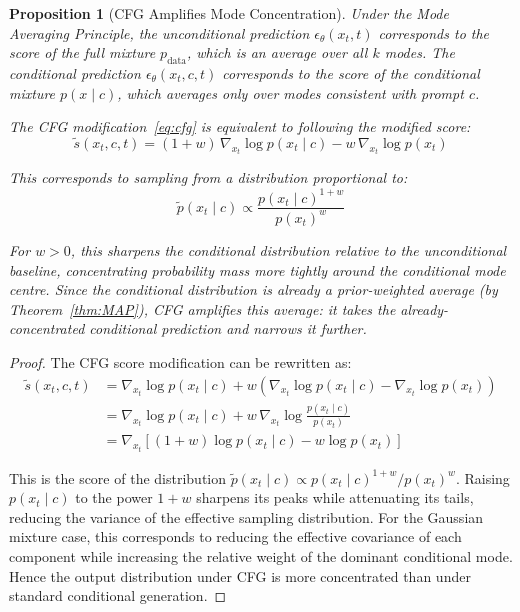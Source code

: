 \documentclass[11pt]{article}
\newtheorem{proposition}[theorem]{Proposition}
\begin{document}
\begin{proposition}[CFG Amplifies Mode Concentration]\label{prop:cfg}
Under the Mode Averaging Principle, the unconditional prediction $\epsilon_\theta(x_t, t)$ corresponds to the score of the full mixture $p_{\mathrm{data}}$, which is an average over all $k$ modes. The conditional prediction $\epsilon_\theta(x_t, c, t)$ corresponds to the score of the conditional mixture $p(x \mid c)$, which averages only over modes consistent with prompt $c$.

The CFG modification~\eqref{eq:cfg} is equivalent to following the modified score:
$$\tilde{s}(x_t, c, t) = (1 + w)\, \nabla_{x_t} \log p(x_t \mid c) - w\, \nabla_{x_t} \log p(x_t)$$

This corresponds to sampling from a distribution proportional to:
$$\tilde{p}(x_t \mid c) \propto \frac{p(x_t \mid c)^{1+w}}{p(x_t)^w}$$

For $w > 0$, this sharpens the conditional distribution relative to the unconditional baseline, concentrating probability mass more tightly around the conditional mode centre. Since the conditional distribution is already a prior-weighted average (by Theorem~\ref{thm:MAP}), CFG amplifies this average: it takes the already-concentrated conditional prediction and narrows it further.
\end{proposition}

\begin{proof}
The CFG score modification can be rewritten as:
\begin{align*}
\tilde{s}(x_t, c, t) &= \nabla_{x_t} \log p(x_t \mid c) + w\left(\nabla_{x_t} \log p(x_t \mid c) - \nabla_{x_t} \log p(x_t)\right) \\
&= \nabla_{x_t} \log p(x_t \mid c) + w\, \nabla_{x_t} \log \frac{p(x_t \mid c)}{p(x_t)} \\
&= \nabla_{x_t} \left[(1+w) \log p(x_t \mid c) - w \log p(x_t)\right]
\end{align*}

This is the score of the distribution $\tilde{p}(x_t \mid c) \propto p(x_t \mid c)^{1+w} / p(x_t)^w$. Raising $p(x_t \mid c)$ to the power $1+w$ sharpens its peaks while attenuating its tails, reducing the variance of the effective sampling distribution. For the Gaussian mixture case, this corresponds to reducing the effective covariance of each component while increasing the relative weight of the dominant conditional mode. Hence the output distribution under CFG is more concentrated than under standard conditional generation.
\end{proof}
\end{document}
